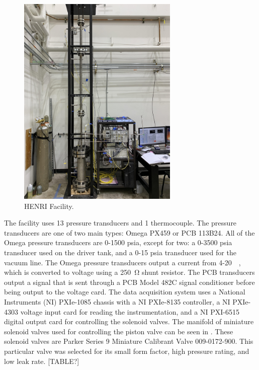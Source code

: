 %
\begin{figure}[htbp]
    \vspace{16pt}
    \centering
    \includegraphics[width=3.024in, height=4.032in]{experiment/photos/Out_of_Pile_Experiment_Setup.jpg}
    \caption{HENRI Facility.}
    \label{fig:HENRI Facility}
    \vspace{16pt}
\end{figure}
%

The facility uses 13 pressure transducers and 1 thermocouple. The pressure transducers are one of two main types: Omega PX459 or PCB 113B24. All of the Omega pressure transducers are 0-1500 psia, except for two: a 0-3500 psia transducer used on the driver tank, and a 0-15 psia transducer used for the vacuum line. The Omega pressure transducers output a current from 4-\SI{20}{\milli\amp}, which is converted to voltage using a \SI{250}{\ohm} shunt resistor. The PCB transducers output a signal that is sent through a PCB Model 482C signal conditioner before being output to the voltage card. The data acquisition system uses a National Instruments (NI) PXIe-1085 chassis with a NI PXIe-8135 controller, a NI PXIe-4303 voltage input card for reading the instrumentation, and a NI PXI-6515 digital output card for controlling the solenoid valves. The manifold of miniature solenoid valves used for controlling the piston valve can be seen in . These solenoid valves are Parker Series 9 Miniature Calibrant Valve 009-0172-900. This particular valve was selected for its small form factor, high pressure rating, and low leak rate. [TABLE?]

